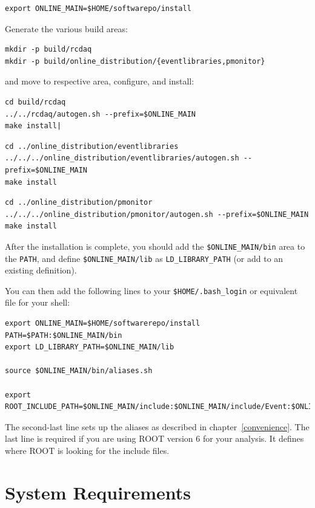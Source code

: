 \documentclass{article}[11pt]
\begin{document}
\begin{verbatim}
export ONLINE_MAIN=$HOME/softwarepo/install
\end{verbatim}

Generate the various build areas:

\begin{verbatim}
mkdir -p build/rcdaq
mkdir -p build/online_distribution/{eventlibraries,pmonitor}
\end{verbatim}

and move to respective area, configure, and install:

\begin{verbatim}
cd build/rcdaq
../../rcdaq/autogen.sh --prefix=$ONLINE_MAIN
make install|
\end{verbatim}

\begin{verbatim}
cd ../online_distribution/eventlibraries
../../../online_distribution/eventlibraries/autogen.sh --prefix=$ONLINE_MAIN
make install
\end{verbatim}

\begin{verbatim}
cd ../online_distribution/pmonitor
../../../online_distribution/pmonitor/autogen.sh --prefix=$ONLINE_MAIN
make install
\end{verbatim}


After the installation is complete, you should add the
\verb|$ONLINE_MAIN/bin| area to the \verb|PATH|, and define
\verb|$ONLINE_MAIN/lib| as \verb|LD_LIBRARY_PATH| (or add to an
existing definition).

You can then add the following lines to your
\verb|$HOME/.bash_login| or equivalent file for your shell:

\begin{verbatim}
export ONLINE_MAIN=$HOME/softwarerepo/install
PATH=$PATH:$ONLINE_MAIN/bin
export LD_LIBRARY_PATH=$ONLINE_MAIN/lib

source $ONLINE_MAIN/bin/aliases.sh

export ROOT_INCLUDE_PATH=$ONLINE_MAIN/include:$ONLINE_MAIN/include/Event:$ONLINE_MAIN/include/pmonitor
\end{verbatim}

The second-last line sets up the aliases as described in
chapter~\ref{convenience}. The last line is required if you are using
ROOT version 6 for your analysis. It defines where ROOT is looking for
the include files.



\section{System Requirements}
\end{document}

